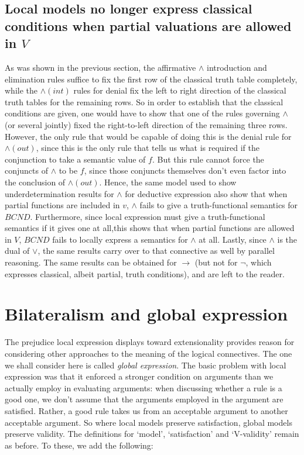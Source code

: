 \documentclass[]{article}
\begin{document}
\subsection{Local models no longer express classical conditions when partial valuations are allowed in $V$}
As was shown in the previous section, the affirmative $\wedge$ introduction and elimination rules suffice to fix the first row of the classical truth table completely, while the $\wedge (int)$ rules for denial fix the left to right direction of the classical truth tables for the remaining rows. So in order to establish that the classical conditions are given, one would have to show that one of the rules governing $\wedge$ (or several jointly) fixed the right-to-left direction of the remaining three rows. However, the only rule that would be capable of doing this is the denial rule for $\wedge (out)$, since this is the only rule that tells us what is required if the conjunction to take a semantic value of $f$. But this rule cannot force the conjuncts of $\wedge$ to be $f$, since those conjuncts themselves don't even factor into the conclusion of $\wedge (out)$. Hence, the same model used to show underdetermination results for $\wedge$ for deductive expression also show that when partial functions are included in $v$, $\wedge$ fails to give a truth-functional semantics for $BCND$. Furthermore, since local expression must give a truth-functional semantics if it gives one at all,this shows that when partial functions are allowed in $V$, $BCND$ fails to locally express a semantics for $\wedge$ at all. Lastly, since $\wedge$ is the dual of $\vee$, the same results carry over to that connective as well by parallel reasoning. The same results can be obtained for $\rightarrow$ (but not for $\neg$, which expresses classical, albeit partial, truth conditions), and are left to the reader.  

\section{Bilateralism and global expression}
The prejudice local expression displays toward extensionality provides reason for considering other approaches to the meaning of the logical connectives. The one we shall consider here is called \textit{global expression}. The basic problem with local expression was that it enforced a stronger condition on arguments than we actually employ in evaluating arguments: when discussing whether a rule is a good one, we don't assume that the arguments employed in the argument are satisfied. Rather, a good rule takes us from an acceptable argument to another acceptable argument. So where local models preserve satisfaction, global models preserve validity. The definitions for `model', `satisfaction' and `V-validity' remain as before. To these, we add the following:
\end{document}
